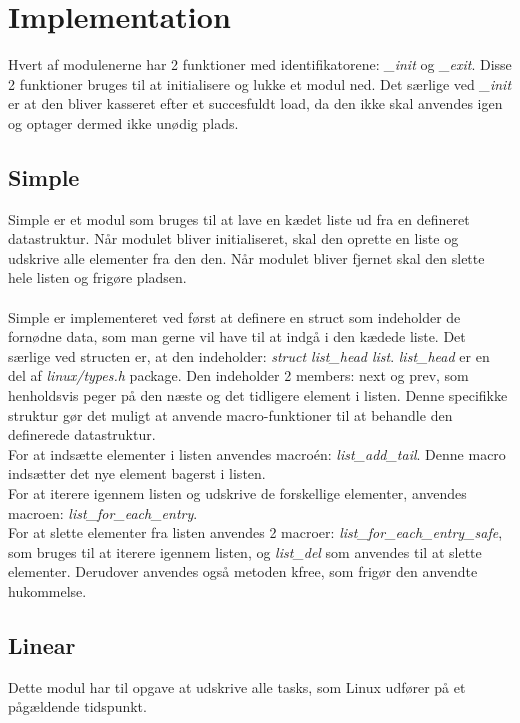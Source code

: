 \chapter{Implementation}
Hvert af modulenerne har 2 funktioner med identifikatorene: \textit{\_init} og \textit{\_exit}. Disse 2 funktioner bruges til at initialisere og lukke et modul ned. Det særlige ved \textit{\_init} er at den bliver kasseret efter et succesfuldt load, da den ikke skal anvendes igen og optager dermed ikke unødig plads.\\
\section{Simple}
Simple er et modul som bruges til at lave en kædet liste ud fra en defineret datastruktur. Når modulet bliver initialiseret, skal den oprette en liste og udskrive alle elementer fra den den. Når modulet bliver fjernet skal den slette hele listen og frigøre pladsen.\\
\\
Simple er implementeret ved først at definere en struct som indeholder de fornødne data, som man gerne vil have til at indgå i den kædede liste. Det særlige ved structen er, at den indeholder: \textit{struct list\_head list}. \textit{list\_head} er en del af \textit{linux/types.h} package. Den indeholder 2 members: next og prev, som henholdsvis peger på den næste og det tidligere element i listen. Denne specifikke struktur gør det muligt at anvende macro-funktioner til at behandle den definerede datastruktur.\\

For at indsætte elementer i listen anvendes macroén: \textit{list\_add\_tail}. Denne macro indsætter det nye element bagerst i listen.\\

For at iterere igennem listen og udskrive de forskellige elementer, anvendes macroen: \textit{list\_for\_each\_entry}.\\

For at slette elementer fra listen anvendes 2 macroer: \textit{list\_for\_each\_entry\_safe}, som bruges til at iterere igennem listen, og \textit{list\_del} som anvendes til at slette elementer. Derudover anvendes også metoden kfree, som frigør den anvendte hukommelse.\\

\section{Linear}
Dette modul har til opgave at udskrive alle tasks, som Linux udfører på et pågældende tidspunkt. 


